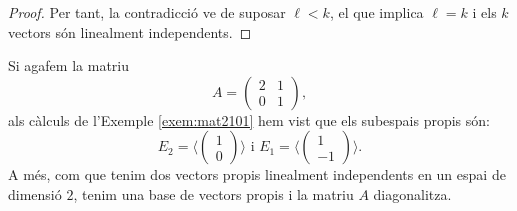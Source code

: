 \begin{proof}
Per tant, la contradicció ve de suposar $\ell<k$, el que implica $\ell=k$ i els $k$ vectors són linealment independents.
\end{proof}

\begin{exemple}
Si agafem la matriu
$$
A=\begin{pmatrix}2 & 1 \\ 0 & 1\end{pmatrix},
$$
als càlculs de l'Exemple \ref{exem:mat2101} hem vist que els subespais propis són:
$$
E_2=\langle\begin{pmatrix}
1 \\ 0 
\end{pmatrix}\rangle
\text{ i }
E_1=\langle\begin{pmatrix}
1 \\ -1 
\end{pmatrix}\rangle.
$$
A més, com que tenim dos vectors propis linealment independents en un espai de dimensió $2$, tenim una base de vectors propis i la matriu $A$ diagonalitza.
\end{exemple}

